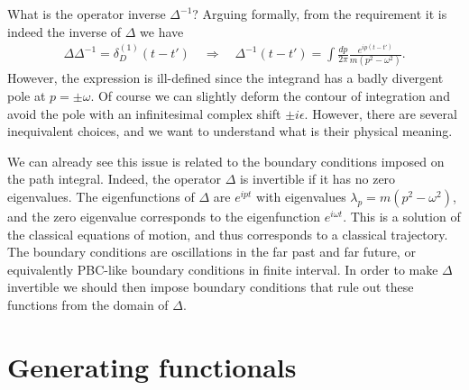 \documentclass[../QFT_main.tex]{subfiles}
\begin{document}
\begin{mytheorem}
What is the operator inverse $\Delta^{-1}$?
Arguing formally, from the requirement it is indeed the inverse of $\Delta$ we have
{\small\begin{align}
    \Delta \Delta^{-1} = \delta_D^{(1)}(t-t') \quad \Rightarrow\quad \Delta^{-1}(t-t') = \int \tfrac{dp}{2\pi} \tfrac{e^{ip(t-t')}}{m(p^2-\omega^2)}.
\end{align}}
However, the expression is ill-defined since the integrand has a badly divergent pole at $p=\pm\omega$.
Of course we can slightly deform the contour of integration and avoid the pole with an infinitesimal complex shift $\pm i\epsilon$.
However, there are several inequivalent choices, and we want to understand what is their physical meaning.

We can already see this issue is related to the boundary conditions imposed on the path integral.
Indeed, the operator $\Delta$ is invertible if it has no zero eigenvalues.
The eigenfunctions of $\Delta$ are $e^{ipt}$ with eigenvalues $\lambda_p=m(p^2-\omega^2)$, and the zero eigenvalue corresponds to the eigenfunction $e^{i\omega t}$.
This is a solution of the classical equations of motion, and thus corresponds to a classical trajectory.
The boundary conditions are oscillations in the far past and far future, or equivalently PBC-like boundary conditions in  finite interval.
In order to make $\Delta$ invertible we should then impose boundary conditions that rule out these functions from the domain of $\Delta$.


\end{mytheorem}








\section{Generating functionals}
\end{document}
